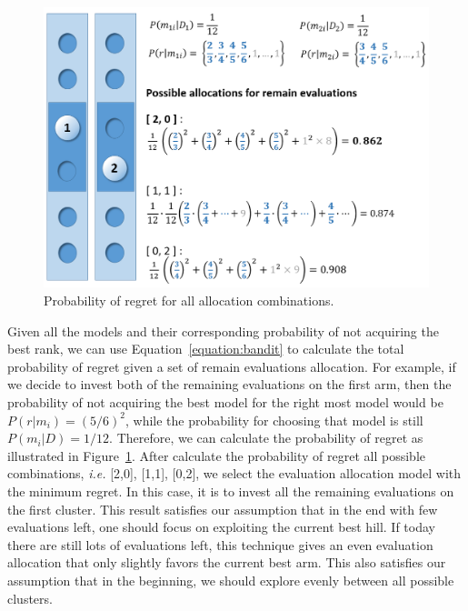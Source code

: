 \begin{figure}
\centering
\includegraphics[width=\textwidth]{Bandit_regret}
\caption{Probability of regret for all allocation combinations.}\label{fig:Bandit_regret}
\end{figure} 
Given all the models and their corresponding probability of not acquiring the best rank, 
we can use Equation~\ref{equation:bandit} to calculate the total probability of regret given a set of remain evaluations allocation.
For example, if we decide to invest both of the remaining evaluations on the first arm,
then the probability of not acquiring the best model for the right most model would be $P(r|m_i) = (5/6)^2$,
while the probability for choosing that model is still $P(m_i|D) = 1/12$.
Therefore, we can calculate the probability of regret as illustrated in Figure~\ref{fig:Bandit_regret}.
After calculate the probability of regret all possible combinations, \textit{i.e.} [2,0], [1,1], [0,2], 
we select the evaluation allocation model with the minimum regret.
In this case, it is to invest all the remaining evaluations on the first cluster.
This result satisfies our assumption that in the end with few evaluations left, 
one should focus on exploiting the current best hill.
If today there are still lots of evaluations left, 
this technique gives an even evaluation allocation that only slightly favors the current best arm.
This also satisfies our assumption that in the beginning, we should explore evenly between all possible clusters.


